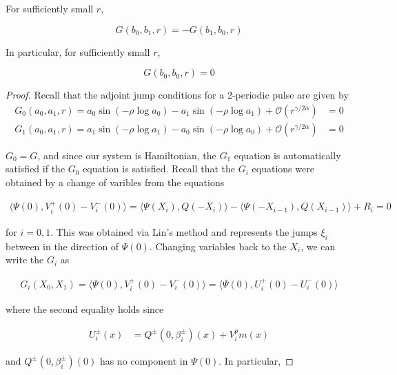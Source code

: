 \documentclass[thesis.tex]{subfiles}
\begin{document}

\begin{lemma}\label{Gsymm}

For sufficiently small $r$,

\begin{equation}
G(b_0, b_1, r) = -G(b_1, b_0, r)
\end{equation}

In particular, for sufficiently small $r$,

\[
G(b_0, b_0, r) = 0
\]

\begin{proof}
Recall that the adjoint jump conditions for a 2-periodic pulse are given by
\begin{align*}
G_0(a_0, a_1, r) = a_0 \sin \left( -\rho \log a_0 \right) - a_1 \sin \left( -\rho \log a_1 \right) + \mathcal{O}(r^{\gamma / 2 \alpha}) &= 0 \\
G_1(a_0, a_1, r) = a_1 \sin \left( -\rho \log a_1 \right) - a_0 \sin \left( -\rho \log a_0 \right) + \mathcal{O}(r^{\gamma / 2 \alpha}) &= 0
\end{align*}

$G_0 = G$, and since our system is Hamiltonian, the $G_1$ equation is automatically satisfied if the $G_0$ equation is satisfied. Recall that the $G_i$ equations were obtained by a change of varibles from the equations

\begin{align}
\langle \Psi(0), V_i^+(0) - V_i^-(0) \rangle = 
\langle \Psi(X_i), Q(-X_i) \rangle - \langle \Psi(-X_{i-1}), Q(X_{i-1}) \rangle + R_i = 0
\end{align}

for $i = 0, 1$. This was obtained via Lin's method and represents the jumps $\xi_i$ between in the direction of $\Psi(0)$. Changing variables back to the $X_i$, we can write the $G_i$ as

\begin{align}\label{GXi}
G_i(X_0, X_1) = \langle \Psi(0), V_i^+(0) - V_i^-(0) \rangle = \langle \Psi(0), U_i^+(0) - U_i^-(0) \rangle
\end{align}

where the second equality holds since

\begin{align*}
U_i^\pm(x) &= Q^\pm(0, \beta_i^\pm)(x) + V_i^pm(x) 
\end{align*}

and $Q^\pm(0, \beta_i^\pm)(0)$ has no component in $\Psi(0)$. In particular,


\end{proof}
\end{lemma}
\end{document}
